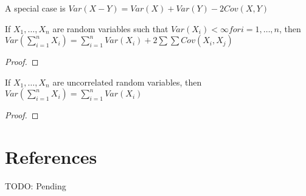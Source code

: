 A special case is $Var\left(X-Y\right)=Var\left(X\right)+Var\left(Y\right)-2Cov\left(X,Y\right)$

\begin{proposition}
If $X_{1},\ldots,X_{n}$ are random variables such that $Var\left(X_{i}\right)<\infty for i=1,\ldots,n$, then $Var\left(\sum_{i=1}^{n}X_{i}\right)=\sum_{i=1}^{n}Var\left(X_{i}\right)+2\sum\sum Cov\left(X_{i},X_{j}\right)$
\end{proposition}
\begin{proof}
\end{proof}

\begin{proposition}
If $X_{1},\ldots,X_{n}$ are uncorrelated random variables, then $Var\left(\sum_{i=1}^{n}X_{i}\right)=\sum_{i=1}^{n}Var\left(X_{i}\right)$
\end{proposition}
\begin{proof}
\end{proof}


%
%
\section*{References}

{\color{red} TODO: Pending}

